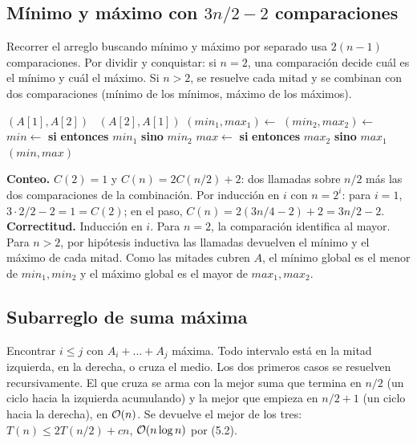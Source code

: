 \subsection{Mínimo y máximo con $3n/2-2$ comparaciones}

Recorrer el arreglo buscando mínimo y máximo por separado usa $2(n-1)$ comparaciones. Por dividir y conquistar: si $n=2$, una comparación decide cuál es el mínimo y cuál el máximo. Si $n>2$, se resuelve cada mitad y se combinan con dos comparaciones (mínimo de los mínimos, máximo de los máximos).

\begin{algorithmic}[1]
 
     \Return $(A[1],A[2])$ \Else\ \Return $(A[2],A[1])$ \EndIf
  \EndIf
  \State $(min_1,max_1)\gets$ 
  \State $(min_2,max_2)\gets$ 
  \State $min\gets$ \textbf{si}  \textbf{entonces} $min_1$ \textbf{sino} $min_2$
  \State $max\gets$ \textbf{si}  \textbf{entonces} $max_2$ \textbf{sino} $max_1$
  \State \Return $(min,max)$
\EndFunction
\end{algorithmic}

\textbf{Conteo.} $C(2)=1$ y $C(n)=2C(n/2)+2$: dos llamadas sobre $n/2$ más las dos comparaciones de la combinación. Por inducción en $i$ con $n=2^i$: para $i=1$, $3\cdot2/2-2=1=C(2)$; en el paso, $C(n)=2(3n/4-2)+2=3n/2-2$. \textbf{Correctitud.} Inducción en $i$. Para $n=2$, la comparación identifica al mayor. Para $n>2$, por hipótesis inductiva las llamadas devuelven el mínimo y el máximo de cada mitad. Como las mitades cubren $A$, el mínimo global es el menor de $min_1,min_2$ y el máximo global es el mayor de $max_1,max_2$.

\subsection{Subarreglo de suma máxima}

Encontrar $i\le j$ con $A_i+\dots+A_j$ máxima. Todo intervalo está en la mitad izquierda, en la derecha, o cruza el medio. Los dos primeros casos se resuelven recursivamente. El que cruza se arma con la mejor suma que termina en $n/2$ (un ciclo hacia la izquierda acumulando) y la mejor que empieza en $n/2+1$ (un ciclo hacia la derecha), en $\mathcal{O}(n)$. Se devuelve el mejor de los tres: $T(n)\le 2T(n/2)+cn$, $\mathcal{O}(n\log n)$ por (5.2).

